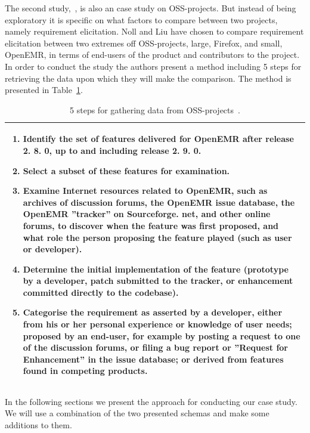 \documentclass[a4paper,11pt]{article}
\begin{document}
{\FloatBarrier
The second study,~\cite{Noll}, is also an case study on OSS-projects. But instead of being exploratory it is specific on what factors to compare between two projects, namely requirement elicitation. Noll and Liu have chosen to compare requirement elicitation between two extremes off OSS-projects, large, Firefox, and small, OpenEMR, in terms of end-users of the product and contributors to the project. In order to conduct the study the authors present a method including 5 steps for retrieving the data upon which they will make the comparison. The method is presented in Table~\ref{tab:openemr}.
\begin{table}[h]
	\centering
	\begin{tabular}{ | p{} |}
		\hline
		\begin{enumerate}
			\item Identify the set of features delivered for OpenEMR after release 2. 8. 0, up to and including release 2. 9. 0.
			\item Select a subset of these features for examination.
			\item Examine Internet resources related to OpenEMR, such as archives of discussion forums, the OpenEMR issue database, the OpenEMR ''tracker'' on Sourceforge. net, and other online forums, to discover when the feature was first proposed, and what role the person proposing the feature played (such as user or developer).
			\item Determine the initial implementation of the feature (prototype by a developer, patch submitted to the tracker, or enhancement committed directly to the codebase).
			\item Categorise the requirement as asserted by a developer, either from his or her personal experience or knowledge of user needs; proposed by an end-user, for example by posting a request to one of the discussion forums, or filing a bug report or ''Request for Enhancement'' in the issue database; or derived from features found in competing products.
		\end{enumerate}\\
		\hline
	\end{tabular}
	\caption{5 steps for gathering data from OSS-projects~\cite{Noll}.}
	\label{tab:openemr}
\end{table}

\FloatBarrier
In the following sections we present the approach for conducting our case study. We will use a combination of the two presented schemas and make some additions to them.

}
\end{document}
